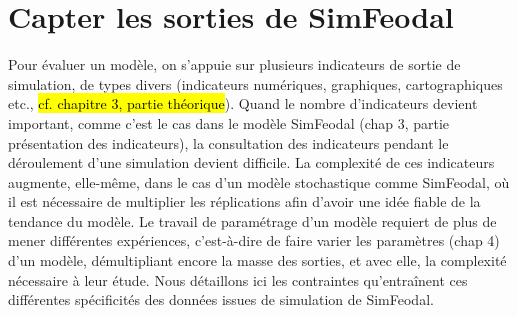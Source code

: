 %
%
%
%

\section{Capter les sorties de SimFeodal}
\label{sec:sorties-simfeodal}
Pour évaluer un modèle, on s’appuie sur plusieurs indicateurs de sortie de simulation, de types divers (indicateurs numériques, graphiques, cartographiques etc., \hl{cf. chapitre 3, partie théorique}).
Quand le nombre d'indicateurs devient important, comme c'est le cas dans le modèle SimFeodal (chap 3, partie présentation des indicateurs), la consultation des indicateurs pendant le déroulement d'une simulation devient difficile.
La complexité de ces indicateurs augmente, elle-même, dans le cas d'un modèle stochastique comme SimFeodal, où il est nécessaire de multiplier les réplications afin d'avoir une idée fiable de la tendance du modèle.
Le travail de paramétrage d'un modèle requiert de plus de mener différentes expériences, c'est-à-dire de faire varier les paramètres (chap 4) d'un modèle, démultipliant encore la masse des sorties, et avec elle, la complexité nécessaire à leur étude.
Nous détaillons ici les contraintes qu’entraînent ces différentes spécificités des données issues de simulation de SimFeodal.

